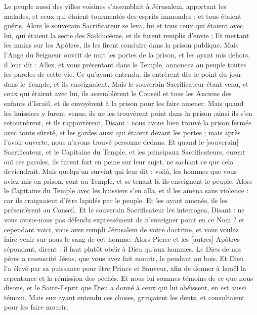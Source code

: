 \begin{multicols}{2}
Le peuple aussi des villes voisines s'assemblait à Jérusalem, apportant les malades, et ceux qui étaient tourmentés des esprits immondes ; et tous étaient guéris.
Alors le souverain Sacrificateur se leva, lui et tous ceux qui étaient avec lui, qui étaient la secte des Sadducéens, et ils furent remplis d'envie ;
Et mettant les mains sur les Apôtres, ils les firent conduire dans la prison publique.
Mais l'Ange du Seigneur ouvrit de nuit les portes de la prison, et les ayant mis dehors, il leur dit :
Allez, et vous présentant dans le Temple, annoncez au peuple toutes les paroles de cette vie.
Ce qu'ayant entendu, ils entrèrent dès le point du jour dans le Temple, et ils enseignaient. Mais le souverain Sacrificateur étant venu, et ceux qui étaient avec lui, ils assemblèrent le Conseil et tous les Anciens des enfants d'Israël, et ils envoyèrent à la prison pour les faire amener.
Mais quand les huissiers y furent venus, ils ne les trouvèrent point dans la prison ;ainsi ils s'en retournèrent, et ils rapportèrent,
Disant : nous avons bien trouvé la prison fermée avec toute sûreté, et les gardes aussi qui étaient devant les portes ; mais après l'avoir ouverte, nous n'avons trouvé personne dedans.
Et quand le [souverain] Sacrificateur, et le Capitaine du Temple, et les principaux Sacrificateurs, eurent ouï ces paroles, ils furent fort en peine sur leur sujet, ne sachant ce que cela deviendrait.
Mais quelqu'un survint qui leur dit : voilà, les hommes que vous aviez mis en prison, sont au Temple, et se tenant là ils enseignent le peuple.
Alors le Capitaine du Temple avec les huissiers s'en alla, et il les amena sans violence : car ils craignaient d'être lapidés par le peuple.
Et les ayant amenés, ils les présentèrent au Conseil. Et le souverain Sacrificateur les interrogea,
Disant : ne vous avons-nous pas défendu expressément de n'enseigner point en ce Nom ? et cependant voici, vous avez rempli Jérusalem de votre doctrine, et vous voulez faire venir sur nous le sang de cet homme.
Alors Pierre et les [autres] Apôtres répondant, dirent : il faut plutôt obéir à Dieu qu'aux hommes.
Le Dieu de nos pères a ressuscité Jésus, que vous avez fait mourir, le pendant au bois.
Et Dieu l'a élevé par sa puissance pour être Prince et Sauveur, afin de donner à Israël la repentance et la rémission des péchés.
Et nous lui sommes témoins de ce que nous disons, et le Saint-Esprit que Dieu a donné à ceux qui lui obéissent, en est aussi témoin.
Mais eux ayant entendu ces choses, grinçaient les dents, et consultaient pour les faire mourir.

\end{multicols}
